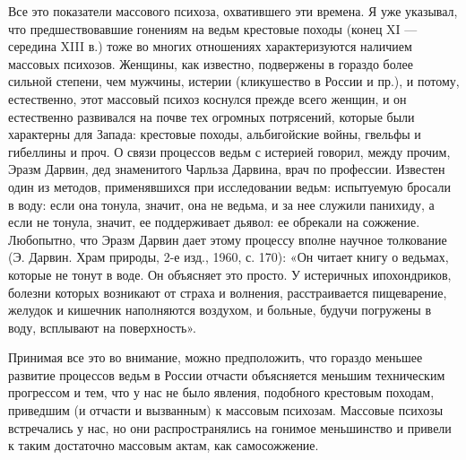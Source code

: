 Все  это  показатели массового  психоза,  охватившего  эти времена.  Я
уже  указывал,  что  предшествовавшие   гонениям  на  ведьм  крестовые
походы  (конец XI  --- середина  XIII  в.) тоже  во многих  отношениях
характеризуются  наличием массовых  психозов.  Женщины, как  известно,
подвержены  в  гораздо более  сильной  степени,  чем мужчины,  истерии
(кликушество в  России и  пр.), и  потому, естественно,  этот массовый
психоз коснулся  прежде всего женщин,  и он естественно  развивался на
почве  тех огромных  потрясений, которые  были характерны  для Запада:
крестовые походы,  альбигойские войны, гвельфы  и гибеллины и  проч. О
связи процессов ведьм с истерией  говорил, между прочим, Эразм Дарвин,
дед знаменитого Чарльза  Дарвина, врач по профессии.  Известен один из
методов, применявшихся  при исследовании  ведьм: испытуемую  бросали в
воду:  если она  тонула,  значит,  она не  ведьма,  и  за нее  служили
панихиду,  а  если  не  тонула, значит,  ее  поддерживает  дьявол:  ее
обрекали на сожжение. Любопытно, что  Эразм Дарвин дает этому процессу
вполне научное толкование (Э. Дарвин. Храм природы, 2-е изд., 1960, с.
170):  «Он  читает книгу  о  ведьмах,  которые  не  тонут в  воде.  Он
объясняет  это  просто.  У истеричных  ипохондриков,  болезни  которых
возникают от страха и  волнения, расстраивается пищеварение, желудок и
кишечник  наполняются воздухом,  и больные,  будучи погружены  в воду,
всплывают на поверхность».

Принимая  все  это  во   внимание,  можно  предположить,  что  гораздо
меньшее развитие процессов ведьм  в России отчасти объясняется меньшим
техническим прогрессом  и тем,  что у нас  не было  явления, подобного
крестовым  походам,  приведшим  (и  отчасти и  вызванным)  к  массовым
психозам. Массовые психозы встречались  у нас, но они распространялись
на гонимое  меньшинство и привели  к таким достаточно  массовым актам,
как самосожжение.

